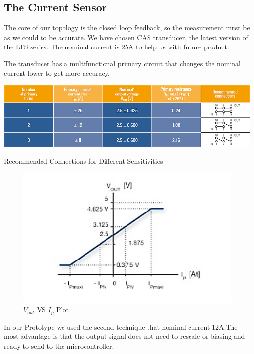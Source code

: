\documentclass[12pt,a4paper]{book}
\begin{document}
\subsection{The Current Sensor}
The core of our topology is the closed loop feedback, so the measurement must be as we could to be accurate. We have chosen CAS transducer, the latest version of the LTS series. The nominal current is 25A to help us with future product.

The transducer has a multifunctional primary circuit that changes the nominal current lower to get more accuracy.
\begin{table}[h!]
  \centering
  \includegraphics[width=14cm]{table2.png}
  \caption{Recommended Connections for Different Sensitivities}
\end{table}
\begin{figure}[h!]
  \centering
  \includegraphics[width = 12cm]{image32.png}
  \caption{$V_{out}$ VS $I_{p}$ Plot}
  \label{fig:image32}
\end{figure}
In our Prototype we used the second technique that nominal current 12A.The most advantage is that the output signal does not need to rescale or biasing and ready to send to the microcontroller.

\end{document}
